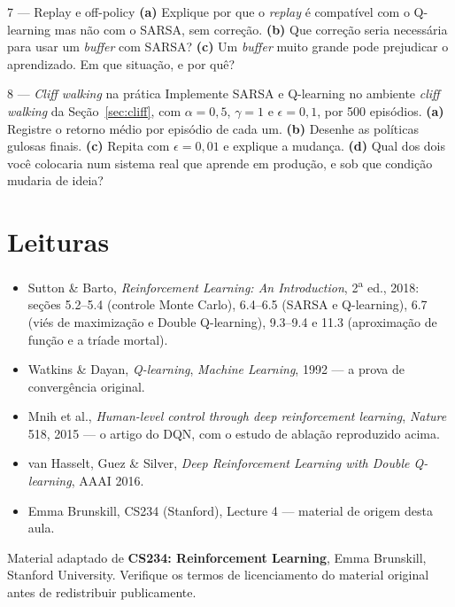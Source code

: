 \documentclass[11pt]{article}
\begin{document}
\begin{exbox}{7 — Replay e off-policy}
  \textbf{(a)} Explique por que o \emph{replay} é compatível com o Q-learning
  mas não com o SARSA, sem correção. \textbf{(b)} Que correção seria necessária
  para usar um \emph{buffer} com SARSA? \textbf{(c)} Um \emph{buffer} muito
  grande pode prejudicar o aprendizado. Em que situação, e por quê?
\end{exbox}

\begin{exbox}{8 — \emph{Cliff walking} na prática}
  Implemente SARSA e Q-learning no ambiente \emph{cliff walking} da
  Seção~\ref{sec:cliff}, com
  $\alpha = 0{,}5$, $\gamma = 1$ e $\epsilon = 0{,}1$, por 500 episódios.
  \textbf{(a)} Registre o retorno médio por episódio de cada um. \textbf{(b)}
  Desenhe as políticas gulosas finais. \textbf{(c)} Repita com
  $\epsilon = 0{,}01$ e explique a mudança. \textbf{(d)} Qual dos dois você
  colocaria num sistema real que aprende em produção, e sob que condição
  mudaria de ideia?
\end{exbox}

\section{Leituras}

\begin{itemize}[itemsep=0.15em]
  \item Sutton \& Barto, \emph{Reinforcement Learning: An Introduction},
    2\textsuperscript{a} ed., 2018: seções 5.2--5.4 (controle Monte Carlo),
    6.4--6.5 (SARSA e Q-learning), 6.7 (viés de maximização e Double
    Q-learning), 9.3--9.4 e 11.3 (aproximação de função e a tríade mortal).
  \item Watkins \& Dayan, \emph{Q-learning}, \emph{Machine Learning}, 1992 ---
    a prova de convergência original.
  \item Mnih et al., \emph{Human-level control through deep reinforcement
    learning}, \emph{Nature} 518, 2015 --- o artigo do DQN, com o estudo de
    ablação reproduzido acima.
  \item van Hasselt, Guez \& Silver, \emph{Deep Reinforcement Learning with
    Double Q-learning}, AAAI 2016.
  \item Emma Brunskill, CS234 (Stanford), Lecture 4 --- material de origem
    desta aula.
\end{itemize}

\vfill
\noindent
{\footnotesize\color{rlCinza}
Material adaptado de \textbf{CS234: Reinforcement Learning}, Emma Brunskill,
Stanford University. Verifique os termos de licenciamento do material original
antes de redistribuir publicamente.}
\end{document}

